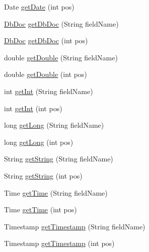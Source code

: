 \begin{DoxyCompactItemize}
Date \mbox{\hyperlink{classcom_1_1mysql_1_1cj_1_1xdevapi_1_1_row_impl_a9b84c0f906c2dbebc0eafeb46f6f498d}{get\+Date}} (int pos)
\item 
\mbox{\hyperlink{interfacecom_1_1mysql_1_1cj_1_1xdevapi_1_1_db_doc}{Db\+Doc}} \mbox{\hyperlink{classcom_1_1mysql_1_1cj_1_1xdevapi_1_1_row_impl_ac7b2a6300ebe058d6800001afef873f9}{get\+Db\+Doc}} (String field\+Name)
\item 
\mbox{\hyperlink{interfacecom_1_1mysql_1_1cj_1_1xdevapi_1_1_db_doc}{Db\+Doc}} \mbox{\hyperlink{classcom_1_1mysql_1_1cj_1_1xdevapi_1_1_row_impl_ab72a6f734779f41bcc280b29cc1e8eb1}{get\+Db\+Doc}} (int pos)
\item 
double \mbox{\hyperlink{classcom_1_1mysql_1_1cj_1_1xdevapi_1_1_row_impl_a6fb9ef074f3882c64d9726bec11717cf}{get\+Double}} (String field\+Name)
\item 
double \mbox{\hyperlink{classcom_1_1mysql_1_1cj_1_1xdevapi_1_1_row_impl_a0d68e0e7539810e3de9a8c2ac247681e}{get\+Double}} (int pos)
\item 
int \mbox{\hyperlink{classcom_1_1mysql_1_1cj_1_1xdevapi_1_1_row_impl_ad8795af0188b9e871b8989b511ad9d20}{get\+Int}} (String field\+Name)
\item 
int \mbox{\hyperlink{classcom_1_1mysql_1_1cj_1_1xdevapi_1_1_row_impl_a442a89a3a56252ec9e09dccfc06843bd}{get\+Int}} (int pos)
\item 
long \mbox{\hyperlink{classcom_1_1mysql_1_1cj_1_1xdevapi_1_1_row_impl_a25f8feae26d2b3335bb3d88e1637bb1d}{get\+Long}} (String field\+Name)
\item 
long \mbox{\hyperlink{classcom_1_1mysql_1_1cj_1_1xdevapi_1_1_row_impl_a796ee8178453ae784c2fe91a00b25be6}{get\+Long}} (int pos)
\item 
String \mbox{\hyperlink{classcom_1_1mysql_1_1cj_1_1xdevapi_1_1_row_impl_ab6d7657c186270e1178f8fcd689c11c2}{get\+String}} (String field\+Name)
\item 
String \mbox{\hyperlink{classcom_1_1mysql_1_1cj_1_1xdevapi_1_1_row_impl_a868fc79bb2f0b9f908c6673b9626778a}{get\+String}} (int pos)
\item 
Time \mbox{\hyperlink{classcom_1_1mysql_1_1cj_1_1xdevapi_1_1_row_impl_ab8794a81f90fded1e6ccc05704e2bc60}{get\+Time}} (String field\+Name)
\item 
Time \mbox{\hyperlink{classcom_1_1mysql_1_1cj_1_1xdevapi_1_1_row_impl_a8f7deff4f0d329375f7a264051f04e29}{get\+Time}} (int pos)
\item 
Timestamp \mbox{\hyperlink{classcom_1_1mysql_1_1cj_1_1xdevapi_1_1_row_impl_a07e19f59090e74951f1c52c73c1e1d63}{get\+Timestamp}} (String field\+Name)
\item 
Timestamp \mbox{\hyperlink{classcom_1_1mysql_1_1cj_1_1xdevapi_1_1_row_impl_ae938f3d1a95707b537489df90ce8d20f}{get\+Timestamp}} (int pos)
\end{DoxyCompactItemize}


